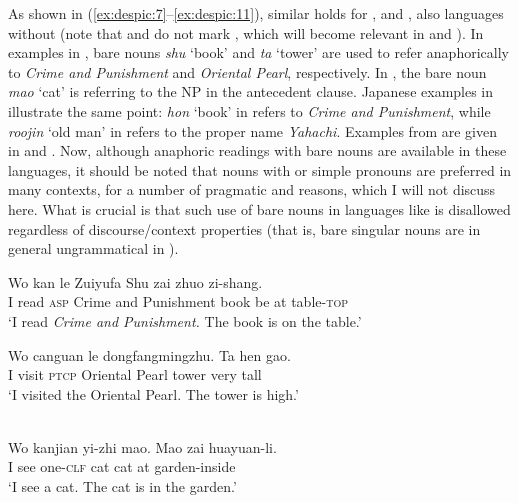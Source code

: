 \documentclass[output=paper,
modfonts
]{langscibook}
\begin{document}
	
	As shown in (\ref{ex:despic:7}--\ref{ex:despic:11}), similar holds for ,  and , also languages without  (note that  and  do not mark , which will become relevant in   and ). In  examples in , bare nouns \textit{shu} `book' and \textit{ta} `tower' are used to refer anaphorically to \textit{Crime and Punishment} and \textit{Oriental Pearl}, respectively. In , the bare noun \textit{mao} `cat' is referring to the NP in the antecedent clause. Japanese examples in  illustrate the same point: \textit{hon} `book' in  refers to \textit{Crime and Punishment}, while \textit{roojin} `old man' in  refers to the proper name \textit{Yahachi}. Examples from  are given in  and . Now, although anaphoric readings with bare nouns are available in these languages, it should be noted that nouns with  or simple pronouns are preferred in many contexts, for a number of pragmatic and  reasons, which I will not discuss here. What is crucial is that such use of bare nouns in languages like  is disallowed regardless of discourse/context properties (that is, bare singular nouns are in general ungrammatical in ).
	
	
	\ea \label{ex:despic:7} 
	\ea \label{ex:despic:7a}
	\gll 
	{Wo} {kan} {le} {Zuiyufa} {Shu} {zai} {zhuo} {zi-shang.} \\
	I read \textsc{asp} {Crime and Punishment} book be at table-\textsc{top} \\
	\glt `I read \textit{Crime and Punishment.} The book is on the table.'
	
	\ex \label{ex:despic:7b}
	\gll 
	{Wo} {canguan} {le} {dongfangmingzhu}. {Ta} {hen} {gao.} \\
	I visit \textsc{ptcp} {Oriental Pearl} tower very tall \\
	\glt `I visited the Oriental Pearl. The tower is high.'
	\z 
	\z
	
	\ea \label{ex:despic:8}
	 \\
	\gll 
	{Wo} {kanjian} {yi-zhi} {mao}. {Mao} {zai} {huayuan-li.} \\
	I see one-\textsc{clf} cat cat at garden-inside \\ 
	\glt `I see a cat. The cat is in the garden.' \citep[403]{Dayal2004}  
	\z 
	
\end{document}
